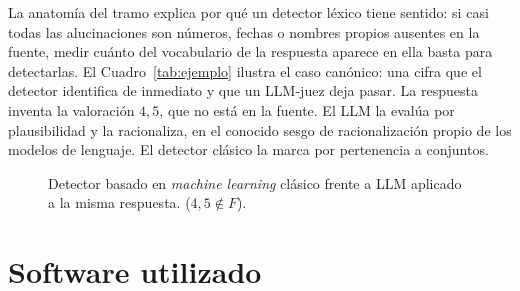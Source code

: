 \documentclass[12pt,a4paper]{report}
\theoremstyle{definition}
\newcommand{\tc}[1]{\texttt{#1}}
\begin{document}
La anatomía del tramo explica por qué un detector léxico tiene sentido: si casi todas las
alucinaciones son números, fechas o nombres propios ausentes en la fuente, medir cuánto del
vocabulario de la respuesta aparece en ella basta para detectarlas. El Cuadro~\ref{tab:ejemplo}
ilustra el caso canónico: una cifra que el detector identifica de inmediato y que un LLM-juez deja
pasar. La respuesta inventa la valoración $4{,}5$, que no está en la fuente. El LLM la evalúa
por plausibilidad y la racionaliza, en el conocido sesgo de racionalización propio de los
modelos de lenguaje. El detector clásico la marca por pertenencia a conjuntos.


\begin{figure}[H]
\centering
{}
\caption{Detector basado en \emph{machine learning} clásico frente a LLM aplicado a la misma respuesta. ($4{,}5\notin F$).}
\label{fig:ejemplo-esquema}
\end{figure}

\section{Software utilizado}
\end{document}

